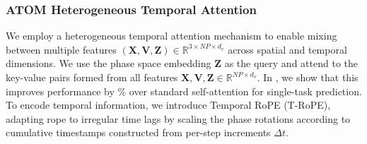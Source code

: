\subsubsection{ATOM Heterogeneous Temporal Attention}
\label{sect:atom_attn}

We employ a heterogeneous temporal attention mechanism to enable mixing between multiple features $({\mathbf{X}}, {\mathbf{V}}, {\mathbf{Z}}) \in \mathbb R^{3 \times N P \times d_v}$ across spatial and temporal dimensions.
We use the phase space embedding ${\mathbf Z}$ as the query and attend to the key-value pairs formed from all features ${\mathbf{X}}, {\mathbf{V}}, {\mathbf{Z}} \in \mathbb R^{NP \times d_v}$. In , we show that this improves performance by \PctImproveCrossAttvsStdAtt\% over standard self-attention for single-task prediction. To encode temporal information, we introduce Temporal RoPE (T-RoPE), adapting \gls{rope} \citep{su_roformer_2023} to irregular time lags by scaling the phase rotations according to cumulative timestamps constructed from per-step increments ${ \Delta t}$.

